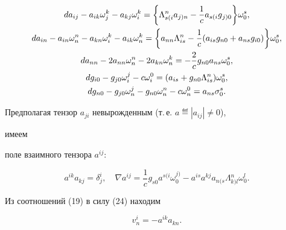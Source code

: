 \begin{gather} 


da_{ij}-a_{ik}\omega^k_j-a_{kj}\omega^k_i=\bigg\{ 


\Lambda{}^n_{s(i}a{}_{j)n}-\frac{1}{c}a{}_{s(i}g{}_{j)0}\bigg\}\omega^s_0,\\ 


%


da_{in}-a_{in}\omega^n_n-a_{kn}\omega^k_i-a_{ik}\omega^k_n= 


\bigg\{a_{nn}\Lambda^n_{is}-\frac{1}{c}(a_{is}g_{n0}+ 


a_{ns}g_{i0})\bigg\}\omega^s_0,\notag\\ 


%


da_{nn}-2a_{nn}\omega^n_n-2a_{kn}\omega^k_n=-\frac{2}{c} 


g_{n0}a_{ns}\omega^s_0,\\ 


%


dg_{i0}-g_{j0}\omega^j_i-c\omega^0_i=(a_{is}+g_{n0} 


\Lambda^n_{is})\omega^s_0,\notag\\ 


%


dg_{n0}-g_{j0}\omega^j_n-g_{n0}\omega^n_n-c\omega^0_n= 


a_{ns}\sigma^s_0. 


\end{gather} 


 


Предполагая тензор $a_{ji}$ невырожденным (т.\,е. $a\eqdef|a_{ij}|\ne0$), 


имеем 


поле взаимного тензора $a^{ij}$: 


\begin{equation} 


a^{ik}a_{kj}=\delta^i_j,\quad \nabla a^{ij}=\frac{1}{c}g_{s0} 


a{}^{s(i}\omega{}^{j)}_0-a^{is}a^{kj}a{}_{n(s}\Lambda{}^n_{k)l} 


\omega^l_0. 


\end{equation} 


Из соотношений (19) в силу (24) находим 


\begin{equation} 


v^i_n=-a^{ik}a_{kn}. 


\end{equation} 


